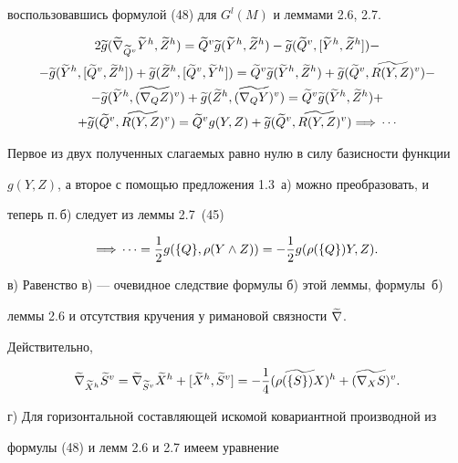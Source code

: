 \begin{pf}
воспользовавшись формулой (48) для $G^l(M)$ и леммами 2.6, 2.7.


\begin{gather*}


2\g{g}(\grn{\tvQ}{\grh{Y}},\grh{Z})=\grv{Q}\g{g}(\grh{Y},\grh{Z})-


\g{g}(\grv{Q},[\grh{Y},\grh{Z}])-\\


-\g{g}(\grh{Y},[\grv{Q},\grh{Z}])+\g{g}(\grh{Z},[\grv{Q},\grh{Y}])=


\grv{Q}\g{g}(\grh{Y},\grh{Z})+\g{g}(\grv{Q},\grv{R(Y,Z)})-\\


-\g{g}(\grh{Y},\grv{(\n{Q}{Z})})+\g{g}(\grh{Z},\grv{(\n{Q}{Y})})


=\grv{Q}\g{g}(\grh{Y},\grh{Z})+\\


+\g{g}(\grv{Q},\grv{R(Y,Z)})=\grv{Q}g(Y,Z)+\g{g}(\grv{Q},\grv{R(Y,Z)})


\Longrightarrow\,\dotsb


\end{gather*}


Первое из двух полученных слагаемых равно нулю в силу базисности функции


$g(Y,Z)$, а второе с помощью предложения 1.3~а) можно преобразовать, и


теперь п.\,б) следует из леммы 2.7~(45)


$$


\Longrightarrow\,\dotsb=\1 g(\{Q\},\rho(Y\land Z))=-\1 g(\rho(\{ Q\})Y,Z).


$$





в) Равенство в) --- очевидное следствие формулы б) этой леммы, формулы~б)


леммы 2.6 и отсутствия кручения у римановой связности $\widetilde {\nabla}$.


Действительно,


$$


\grn{\thX}{\grv{S}}=\grn{\widetilde S^v}{\grh{X}}+[\grh{X},\grv{S}]=-\4


\grh{(\rho(\{S\})X)}+\grv{(\n{X}{S})}.


$$





г) Для горизонтальной составляющей искомой ковариантной производной из


формулы (48) и лемм 2.6 и 2.7 имеем уравнение



\end{pf}
